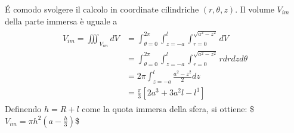 \documentclass[letterpaper,10pt,italian]{jupyterBook}
\begin{document}
\sphinxAtStartPar
{} É comodo svolgere il calcolo in
coordinate cilindriche \((r,\theta,z)\). Il volume \(V_{im}\) della parte
immersa è uguale a
\begin{equation*}
\begin{split}\begin{aligned}
V_{im} = \iiint_{V_{im}} dV & = \int_{\theta=0}^{2\pi} \int_{z=-a}^{l} \int_{r=0}^{\sqrt{a^2-z^2}} dV \\
                & = \int_{\theta=0}^{2\pi} \int_{z=-a}^{l} \int_{r=0}^{\sqrt{a^2-z^2}} r dr dz d\theta \\
                & = 2\pi \int_{z=-a}^{l} \frac{a^2-z^2}{2} dz \\
                & = \frac{\pi}{3} [2 a^3 + 3 a^2 l - l^3]
\end{aligned}\end{split}
\end{equation*}
\sphinxAtStartPar
Definendo \(h = R+l\) come la quota immersa della sfera, si ottiene:
\$\(V_{im} = \pi h^2 \displaystyle \left( a - \frac{h}{3} \right)\)\$

\sphinxstepscope
\end{document}
